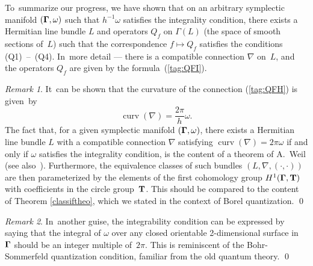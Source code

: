 \documentclass[11pt]{amsart}
\numberwithin{equation}{section}
\theoremstyle{remark}
\newtheorem{remark*}{Remark}
\newcommand\TT{{\bold T}}
\newcommand\Omg{{\bigam}}   %
\newcommand\curv{\operatorname{curv}}
\newcommand{\bigam}{\mbox{\boldmath $\Gamma$}}
\begin{document}
To~summarize our progress, we have shown that on an arbitrary symplectic
manifold $(\Omg,\omega)$ such that $h^{-1}\omega$ satisfies the integrality
condition, there exists a Hermitian line bundle $L$ and operators $Q_f$ on
$\Gamma(L)$ (the space of smooth sections of~$L$) such that the correspondence
$f\mapsto Q_f$ satisfies the conditions (Q1)~--~(Q4). In~more detail --- there
is a compatible connection $\nabla$ on~$L$, and the operators $Q_f$ are given
by the formula~(\ref{tag:QFI}).

\begin{remark*} It~can be shown that the curvature of the connection
(\ref{tag:QFH}) is given~by
$$ \curv(\nabla) = \frac{2\pi}h \omega.  $$
The fact that, for a given symplectic manifold $(\Omg,\omega)$, there exists a
Hermitian line bundle $L$ with a compatible connection $\nabla$ satisfying
$\curv(\nabla)=2\pi\omega$ if and only if $\omega$ satisfies the integrality
condition, is the content of a theorem of A.~Weil \cite{bib:WeilVK} (see
also~\cite{bib:Kost}). Furthermore, the equivalence classes of such bundles
$(L,\nabla,(\cdot,\cdot))$ are then parameterized by the elements of the first
cohomology group $H^1(\Omg,\TT)$ with coefficients in the circle group~$\TT$.
This should be compared to the content of Theorem \ref{classiftheo}, which we
stated in the context of Borel quantization.
\qed  \end{remark*}

\begin{remark*} In~another guise, the integrability condition can be expressed
by saying that the integral of $\omega$ over any closed orientable
2-dimensional surface in~$\Omg$ should be an integer multiple of~$2\pi$.
This is reminiscent of the Bohr-Sommerfeld quantization condition,
familiar from the old quantum theory. \qed
\end{remark*}
\end{document}
